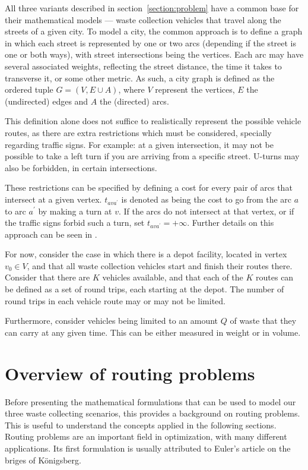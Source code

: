 All three variants described in section~\ref{section:problem} have a common
base for their mathematical models --- waste collection vehicles that travel
along the streets of a given city. To model a city, the common approach is to
define a graph in which each street is represented by one or two arcs
(depending if the street is one or both ways), with street intersections being
the vertices. Each arc may have several associated weights, reflecting the
street distance, the time it takes to transverse it, or some other metric. As
such, a city graph is defined as the ordered tuple $G = (V, E \cup A)$, where
$V$ represent the vertices, $E$ the (undirected) edges and $A$ the (directed)
arcs.

This definition alone does not suffice to realistically represent the possible
vehicle routes, as there are extra restrictions which must be considered,
specially regarding traffic signs. For example: at a given intersection, it may
not be possible to take a left turn if you are arriving from a specific street.
U-turns may also be forbidden, in certain intersections. 

These restrictions can be specified by defining a cost for every pair of arcs
that intersect at a given vertex. $t_{ava^\prime}$ is denoted as being the
cost to go from the arc $a$ to arc $a^\prime$ by making a turn at $v$. If the
arcs do not intersect at that vertex, or if the traffic signs forbid such a
turn, set $t_{ava^\prime} = +\infty$. Further details on this approach can
be seen in \citet{Corberan2002887}.

For now, consider the case in which there is a depot facility, located in
vertex $v_0 \in V$, and that all waste collection vehicles start and finish
their routes there. Consider that there are $K$ vehicles available, and that
each of the $K$ routes can be defined as a set of round trips, each starting at
the depot. The number of round trips in each vehicle route may or may not be
limited.

Furthermore, consider vehicles being limited to an amount $Q$ of waste that
they can carry at any given time. This can be either measured in weight or in
volume.






\section{Overview of routing problems}
\label{section:over-rp}

Before presenting the mathematical formulations that can be used to model our
three waste collecting scenarios, this provides a background on routing
problems. This is useful to understand the concepts applied in the following
sections. Routing problems are an important field in optimization, with many
different applications. Its first formulation is usually attributed to Euler's
article on the briges of Königsberg\citet{Euler1736}.

